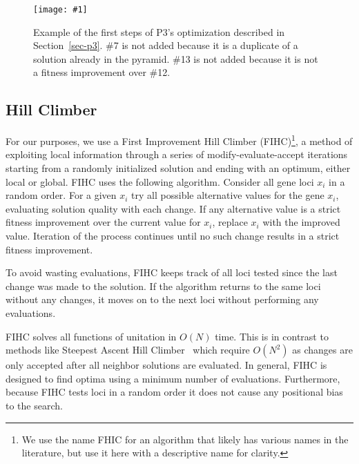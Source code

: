 \documentclass{sig-alternate}
\newcommand{\includegraphicsfit}[1]
{\texttt{[image: \#1]}}
\begin{document}
\begin{figure}
  \centering
  \includegraphicsfit{P3_big_fail}
  \caption{Example of the first steps of P3's optimization described in Section~\ref{sec-p3}.
  \#7 is not added because it is a duplicate of a solution already in the pyramid.  \#13 is
  not added because it is not a fitness improvement over \#12.}
  \label{fig-p3}
\end{figure}

\subsection{Hill Climber}
\label{sec-hillclimber}

For our purposes, we use a First Improvement Hill Climber
(FIHC)\footnote{We use the name FHIC for an algorithm that likely has
  various names in the literature, but use it here with a descriptive
  name for clarity.}, a method of exploiting local information through
a series of modify-evaluate-accept iterations starting from a randomly
initialized solution and ending with an optimum, either local or global.
FIHC uses the following algorithm.  Consider all gene loci
$x_i$ in a random order.  For a given $x_i$ try all possible
alternative values for the gene $x_i$, evaluating solution quality
with each change.  If any alternative value is a strict fitness improvement
over the current value for $x_i$, replace $x_i$ with the improved
value.  Iteration of the process continues until no such change results in
a strict fitness improvement.

To avoid wasting evaluations, FIHC keeps track of all loci tested since the last
change was made to the solution.  If the algorithm returns to the same loci without
any changes, it moves on to the next loci without performing any evaluations.

FIHC solves all functions of unitation in $O(N)$ time.  This is in contrast to
methods like Steepest Ascent Hill Climber~\cite{bosman:2011:lsbbo, goldman:2012:ltga}
which require $O(N^2)$ as changes are only accepted after all neighbor solutions
are evaluated.  In general, FIHC is designed to find optima using a minimum number
of evaluations.  Furthermore, because FIHC tests loci in a random order it does
not cause any positional bias to the search.
\end{document}
